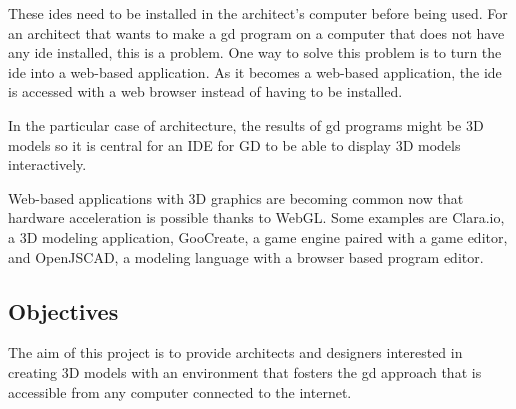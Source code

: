 \documentclass{./llncs2e/llncs}
\begin{document}
	These \acp{ide} need to be installed in the architect's computer before being used.
	For an architect that wants to make a \ac{gd} program on a computer that does not have any \ac{ide} installed, this is a problem.
	One way to solve this problem is to turn the \ac{ide} into a web-based application.
	As it becomes a web-based application, the \ac{ide} is accessed with a web browser instead of having to be installed.

	In the particular case of architecture, the results of \ac{gd} programs might be 3D models so it is central for an IDE for GD to be able to display 3D models interactively.
	
	Web-based applications with 3D graphics are becoming common now that hardware acceleration is possible thanks to WebGL\cite{marrin2011webgl}.
	Some examples are Clara.io\cite{houston2013clara}, a 3D modeling application, GooCreate\cite{goocreate2015site}, a game engine paired with a game editor, and OpenJSCAD\cite{openjscad2015site}, a modeling language with a browser based program editor.
	
	
\subsection{Objectives}
	The aim of this project is to provide architects and designers interested in creating 3D models with an environment that fosters the \acl{gd} approach that is accessible from any computer connected to the internet.
\end{document}
